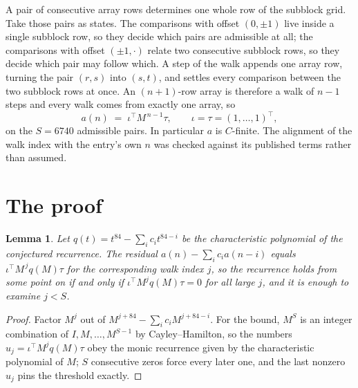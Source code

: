 \documentclass[11pt,a4paper]{article}
\theoremstyle{plain}
\newtheorem{lemma}[theorem]{Lemma}
\theoremstyle{definition}
\begin{document}
A pair of consecutive array rows determines one whole row of the subblock grid. Take those
pairs as states. The comparisons with offset $(0,\pm1)$ live inside a single subblock row, so
they decide which pairs are admissible at all; the comparisons with offset $(\pm1,\cdot)$
relate two consecutive subblock rows, so they decide which pair may follow which. A step of the
walk appends one array row, turning the pair $(r,s)$ into $(s,t)$, and settles every comparison
between the two subblock rows at once. An $(n+1)$-row array is therefore a walk of $n-1$ steps
and every walk comes from exactly one array, so
\[
a(n)\;=\;\iota^{\!\top}M^{\,n-1}\tau,\qquad \iota=\tau=(1,\dots,1)^{\!\top},
\]
on the $S=6740$ admissible pairs. In particular $a$ is $C$-finite. The alignment of the walk
index with the entry's own $n$ was checked against its published terms rather than assumed.

\section{The proof}

\begin{lemma}\label{lem:crit}
Let $q(t)=t^{84}-\sum_i c_it^{84-i}$ be the characteristic polynomial of the
conjectured recurrence. The residual $a(n)-\sum_ic_ia(n-i)$ equals
$\iota^{\!\top}M^{\,j}q(M)\tau$ for the corresponding walk index $j$, so the recurrence
holds from some point on if and only if $\iota^{\!\top}M^{j}q(M)\tau=0$ for all large $j$,
and it is enough to examine $j<S$.
\end{lemma}

\begin{proof}
Factor $M^{j}$ out of $M^{j+84}-\sum_ic_iM^{j+84-i}$. For the bound, $M^{S}$
is an integer combination of $I,M,\dots,M^{S-1}$ by Cayley--Hamilton, so the numbers
$u_j=\iota^{\!\top}M^{j}q(M)\tau$ obey the monic recurrence given by the characteristic
polynomial of $M$; $S$ consecutive zeros force every later one, and the last nonzero $u_j$
pins the threshold exactly.
\end{proof}
\end{document}
